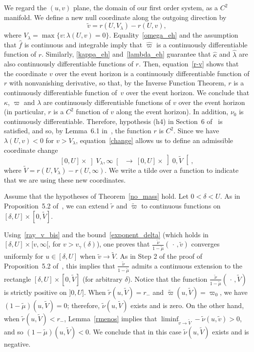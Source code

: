 \documentclass[a4paper,11pt,oneside,reqno]{amsart}
\begin{document}
We regard the $(u,v)$ plane, the domain of our first order system, as a $C^2$ manifold.
We define a new null coordinate along the outgoing direction by
\begin{equation}\label{change}
\tilde v=r(U,V_\lambda)-r(U,v),
\end{equation}
where $V_\lambda=\max\{v:\lambda(U,v)=0\}$.
Equality~\eqref{omega_eh} and the assumption that $\hat{f}$ is continuous and integrable
imply that $\hat{\varpi}$ is a continuously differentiable function of $r$.
Similarly, \eqref{kappa_eh} and~\eqref{lambda_eh} guarantee that $\hat\kappa$ and 
$\hat\lambda$ are also continuously differentiable functions of $r$.
Then, equation~\eqref{r-v} shows that the coordinate $v$ over the event horizon is a
continuously differentiable function of $r$ with nonvanishing derivative, so that,
by the Inverse Function Theorem, $r$ is a continuously differentiable function
of~$v$ over the event horizon. We conclude that $\kappa$, $\varpi$ and $\lambda$ are
continuously differentiable functions of $v$ over the event horizon (in particular, $r$ is a $C^2$ function of $v$ along the event horizon). In addition, $\nu_0$
is continuously differentiable. Therefore, hypothesis (h4) in Section~6 of~\cite{relIst1} is 
satisfied, and so, by Lemma~6.1 in~\cite{relIst1}, the function $r$ is $C^2$.
Since we have $\lambda(U,v)<0$ for $v>V_\lambda$, equation~\eqref{change} allows us to define an
 admissible coordinate change
 $$[0,U]\times\left]V_\lambda,\infty\right[\,\ \rightarrow\ [0,U]\times\left]0,\tilde V\right[,$$
 where $\tilde V=r(U,V_\lambda)-r(U,\infty)$. We write a tilde over
 a function to indicate that we are using these new coordinates.

Assume that the hypotheses of Theorem~\ref{no_mass} hold. Let $0<\delta<U$.
As in Proposition~5.2 of~\cite{relIst3},
we can extend $\tilde r$ and $\tilde{\varpi}$ to continuous functions
on $[\delta,U]\times[0,\tilde V]$.

Using~\eqref{ray_v_bis} and the bound~\eqref{exponent_delta}
(which holds in $[\delta,U]\times[v,\infty[$, for $v>v_\gamma(\delta)$),
one proves that $\frac{\tilde\nu}{1-\tilde\mu}(\,\cdot\,,\tilde v)$
converges uniformly for $u\in[\delta,U]$ when $\tilde v\to \tilde V$.
As in Step 2 of the proof of Proposition~5.2 of~\cite{relIst3}, this implies that
$\frac{\tilde\nu}{1-\tilde\mu}$ admits a continuous extension to the
rectangle $[\delta,U]\times[0, \tilde V]$ (for arbitrary $\delta$). Notice that the function
$\frac{\tilde\nu}{1-\tilde\mu}(\,\cdot\,, \tilde V)$ is strictly positive on $]0,U]$.
When $\tilde r(u,\tilde V)=r_-$ and $\tilde\varpi(u,\tilde V)=\varpi_0$, we have $(1-\tilde\mu)(u,\tilde V)=0$; 
therefore, $\tilde\nu(u,\tilde V)$ exists and
is zero. On the other hand, when $\tilde r(u,\tilde V)<r_-$, Lemma~\ref{rmenos} implies that $\liminf_{\tilde v\to \tilde V}-\tilde{\nu}(u,\tilde v)>0$,
and so $(1-\tilde{\mu})(u,\tilde V)<0$. We conclude that in this case $\tilde{\nu}(u,\tilde V)$ exists and is negative.
\end{document}
